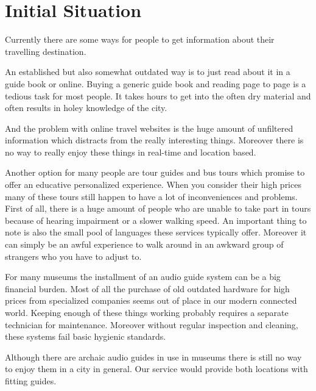 \documentclass[12pt]{article}
\theoremstyle{definition}
\newenvironment{text}{
}{}
\begin{document}
\section{Initial Situation}
\begin{text}
Currently there are some ways for people to get information about their travelling destination.\newline

An established but also somewhat outdated way is to just read about it in a guide book or online.
Buying a generic guide book and
reading page to page is a tedious task for most people. It takes hours to get into the often dry material and often results in holey knowledge of the city.\newline

And the problem with online travel websites is the huge amount of unfiltered information which distracts from the really interesting things. Moreover there is no way to really enjoy these things in real-time and location based.\newline
 
Another option for many people are tour guides and bus tours which promise to offer an educative personalized experience. %
When you consider their high prices many of these tours still happen to have a lot of inconveniences and problems. First of all, there is a huge amount of people who are unable to take part in tours because of hearing impairment or a slower walking speed. An important thing to note is also the small pool of languages these services typically offer. Moreover it can simply be an awful experience to walk around in an awkward group of strangers who you have to adjust to.\newline
 
For many museums the installment of an audio guide system can be a big financial burden. Most of all the purchase of old outdated hardware for high prices from specialized companies seems out of place in our modern connected world. Keeping enough of these things working probably requires a separate technician for maintenance.
Moreover without regular inspection and cleaning, these systems fail basic hygienic standards. \newline

Although there are archaic audio guides in use in museums there is still no way to enjoy them in a city in general. Our service would provide both locations with fitting guides.
 
\end{text}
 
\end{document}
